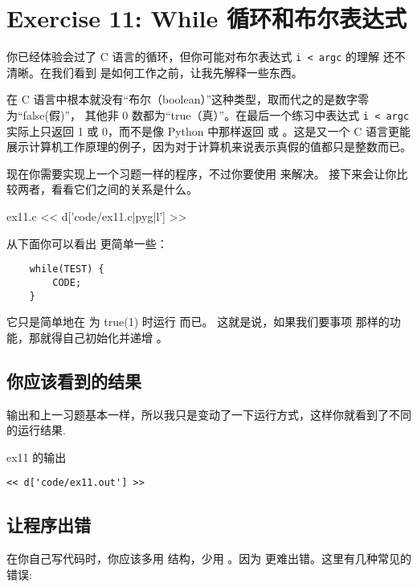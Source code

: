 \chapter{Exercise 11: While 循环和布尔表达式}

你已经体验会过了 C 语言的循环，但你可能对布尔表达式 \verb|i < argc| 的理解
还不清晰。在我们看到  是如何工作之前，让我先解释一些东西。

在 C 语言中根本就没有“布尔（boolean）”这种类型，取而代之的是数字零为“false(假)”，
其他非 0 数都为“true（真）”。在最后一个练习中表达式 \verb|i < argc| 实际上只返回 
1 或 0，而不是像 Python 中那样返回  或 。这是又一个 C 
语言更能展示计算机工作原理的例子，因为对于计算机来说表示真假的值都只是整数而已。

现在你需要实现上一个习题一样的程序，不过你要使用 来解决。 
接下来会让你比较两者，看看它们之间的关系是什么。

\begin{code}{ex11.c}
<< d['code/ex11.c|pyg|l'] >>
\end{code}

从下面你可以看出  更简单一些：

\begin{Verbatim}
    while(TEST) {
        CODE;
    }
\end{Verbatim}

它只是简单地在  为 true(1) 时运行 而已。
这就是说，如果我们要事项  那样的功能，那就得自己初始化并递增 。

\section{你应该看到的结果}

输出和上一习题基本一样，所以我只是变动了一下运行方式，这样你就看到了不同的运行结果.

\begin{code}{ex11 的输出}
\begin{lstlisting}
<< d['code/ex11.out'] >>
\end{lstlisting}
\end{code}

\section{让程序出错}

在你自己写代码时，你应该多用 结构，少用 。因为
 更难出错。这里有几种常见的错误:

